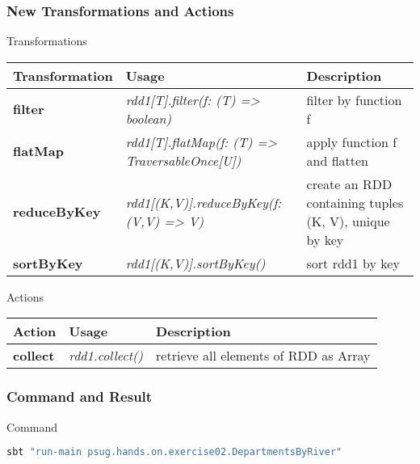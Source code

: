 \documentclass[slidetop,9pt,utf8]{beamer}
\begin{document}
\begin{CJK}{UTF8}{gbsn}
\begin{frame}

  \frametitle{New Transformations and Actions}

  \begin{block}{Transformations}
    \begin{center}
      \begin{tabular}{|m{2.0cm}|m{4.0cm}|m{4.9cm}|}
        \hline 
        \rowcolor{gray} \textbf{Transformation} & \textbf{Usage} & \textbf{Description} \\ \hline
        \textbf{filter} & \textit{rdd1[T]\newline.filter(f: (T) =\textgreater\xspace boolean)} & filter by function f \\ \hline
        \textbf{flatMap} & \textit{rdd1[T].flatMap(f: (T) =\textgreater\xspace TraversableOnce[U])} & apply function f and flatten \\ \hline
        \textbf{reduceByKey} & \textit{rdd1[(K,V)]\newline.reduceByKey(f:(V,V) =\textgreater\xspace V)} & create an RDD containing tuples (K, V), unique by key \\ \hline
        \textbf{sortByKey} & \textit{rdd1[(K,V)].sortByKey()} & sort rdd1 by key \\ \hline
      \end{tabular}
    \end{center}
  \end{block}

  \begin{block}{Actions}
    \begin{center}
      \begin{tabular}{|m{2.0cm}|m{4.0cm}|m{4.9cm}|}
        \hline 
        \rowcolor{gray} \textbf{Action} & \textbf{Usage} & \textbf{Description} \\ \hline
        \textbf{collect} & \textit{rdd1.collect()} & retrieve all elements of RDD as Array \\ \hline
      \end{tabular}
    \end{center}
  \end{block}

\end{frame}

\begin{frame}[fragile]
  \frametitle{Command and Result}

  \begin{block}{Command}
    \begin{lstlisting}[language=bash, style=terminal]
sbt "run-main psug.hands.on.exercise02.DepartmentsByRiver"
    \end{lstlisting}
  \end{block}


\end{frame}
\end{CJK}
\end{document}

